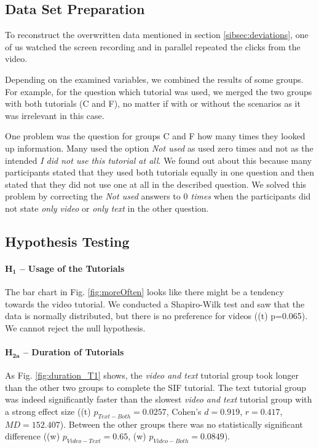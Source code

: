 \subsection{Data Set Preparation}
To reconstruct the overwritten data mentioned in section \ref{sibsec:deviations}, one of us watched the screen recording and in parallel repeated the clicks from the video. 

Depending on the examined variables, we combined the results of some groups. For example, for the question which tutorial was used, we merged the two groups with both tutorials (C and F), no matter if with or without the scenarios as it was irrelevant in this case. 

One problem was the question for groups C and F how many times they looked up information. Many used the option \textit{Not used} as used zero times and not as the intended \textit{I did not use this tutorial at all}. We found out about this because many participants stated that they used both tutorials equally in one question and then stated that they did not use one at all in the described question. We solved this problem by correcting the \textit{Not used} answers to \textit{$0$ times} when the participants did not state \textit{only video} or \textit{only text} in the other question.  

\subsection{Hypothesis Testing}

\paragraph{$\mathbf{H_1}$ -- Usage of the Tutorials}
\label{H1}
The bar chart in Fig. \ref{fig:moreOften} looks like there might be a tendency towards the video tutorial. We conducted a Shapiro-Wilk test and saw that the data is normally distributed, but there is no preference for videos ((t) p=0.065). We cannot reject the null hypothesis.


\paragraph{$\mathbf{H_{2a}}$ -- Duration of Tutorials}
As Fig. \ref{fig:duration_T1} shows, the \textit{video and text} tutorial group took longer than the other two groups to complete the SIF tutorial.
The text tutorial group was indeed significantly faster than the slowest \textit{video and text} tutorial group with a strong effect size ((t) $p_{\mathit{Text-Both}}=0.0257$, Cohen's $d =0.919$, $r=0.417$, $\mathit{MD}=152.407$). Between the other groups there was no statistically significant difference ((w) $p_{\mathit{Video-Text}}=0.65$, (w) $p_{\mathit{Video-Both}}=0.0849$).


